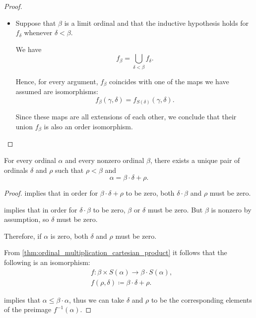 \begin{proof}
\begin{itemize}
    Therefore, since \( f_\delta \) is an isomorphism, \( f_\beta \) also is.

    \item Suppose that \( \beta \) is a limit ordinal and that the inductive hypothesis holds for \( f_\delta \) whenever \( \delta < \beta \).

    We have
    \begin{equation*}
      f_\beta = \bigcup_{\delta < \beta} f_\delta.
    \end{equation*}

    Hence, for every argument, \( f_\beta \) coincides with one of the maps we have assumed are isomorphisms:
    \begin{equation*}
      f_\beta(\gamma, \delta) = f_{S(\delta)}(\gamma, \delta).
    \end{equation*}

    Since these maps are all extensions of each other, we conclude that their union \( f_\beta \) is also an order isomorphism.
  \end{itemize}
\end{proof}

\begin{corollary}\label{thm:ordinal_division}
  For every ordinal \( \alpha \) and every nonzero ordinal \( \beta \), there exists a unique pair of ordinals \( \delta \) and \( \rho \) such that \( \rho < \beta \) and
  \begin{equation*}
    \alpha = \beta \cdot \delta + \rho.
  \end{equation*}
\end{corollary}
\begin{proof}
    implies that in order for \( \beta \cdot \delta + \rho \) to be zero, both \( \delta \cdot \beta \) and \( \rho \) must be zero.

   implies that in order for \( \delta \cdot \beta \) to be zero, \( \beta \) or \( \delta \) must be zero. But \( \beta \) is nonzero by assumption, so \( \delta \) must be zero.

  Therefore, if \( \alpha \) is zero, both \( \delta \) and \( \rho \) must be zero.

   From \cref{thm:ordinal_multiplication_cartesian_product} it follows that the following is an isomorphism:
  \begin{equation*}
    \begin{aligned}
      &f: \beta \times S(\alpha) \to \beta \cdot S(\alpha), \\
      &f(\rho, \delta) \coloneqq \beta \cdot \delta + \rho.
    \end{aligned}
  \end{equation*}

   implies that \( \alpha \leq \beta \cdot \alpha \), thus we can take \( \delta \) and \( \rho \) to be the corresponding elements of the preimage \( f^{-1}(\alpha) \).
\end{proof}

